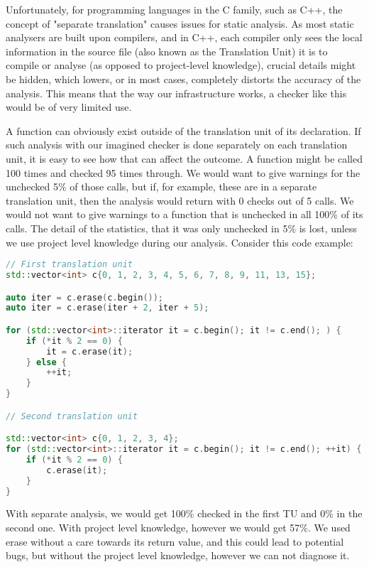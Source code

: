 Unfortunately, for programming languages in the C family, such as C++, the concept of "separate translation" causes issues for static
analysis. As most static analysers are built upon compilers, and in C++, each compiler only sees the local information in the source file
(also known as the Translation Unit) it is to compile or analyse (as opposed to project-level knowledge), crucial details
might be hidden, which lowers, or in most cases, completely distorts the accuracy of the analysis.
This means that the way our infrastructure works, a checker like this would be of very limited use.
\par A function can obviously exist outside of the translation unit of its declaration. If such analysis with our imagined checker is done
separately on each translation unit, it is easy to see how that can affect the outcome. A function might be called 100 times and 
checked 95 times through. We would want to give warnings for the unchecked 5\% of those calls, but if, for example, these are in a 
separate translation unit, then the analysis would return with 0 checks out of 5 calls. We would not want to give warnings to a
function that is unchecked in all 100\% of its calls. The detail of the statistics, that it was only unchecked in 5\% is lost,
unless we use project level knowledge during our analysis. Consider this code example:

\begin{lstlisting}[language={C++}]
// First translation unit
std::vector<int> c{0, 1, 2, 3, 4, 5, 6, 7, 8, 9, 11, 13, 15};

auto iter = c.erase(c.begin());
auto iter = c.erase(iter + 2, iter + 5);

for (std::vector<int>::iterator it = c.begin(); it != c.end(); ) {
    if (*it % 2 == 0) {
        it = c.erase(it);
    } else {
        ++it;
    }
}

// Second translation unit

std::vector<int> c{0, 1, 2, 3, 4};
for (std::vector<int>::iterator it = c.begin(); it != c.end(); ++it) {
    if (*it % 2 == 0) {
        c.erase(it);
    }
}
\end{lstlisting}

With separate analysis, we would get 100\% checked in the first TU and 0\% in the second one. With project level knowledge, however we
would get 57\%. We used erase without a care towards its return value, and this could lead to potential bugs, but without the project
level knowledge, however we can not diagnose it.

